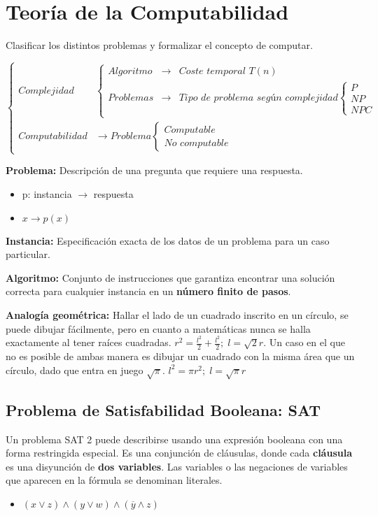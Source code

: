 \chapter{Teoría de la Computabilidad}\label{ch:teoria-de-la-computabilidad}
Clasificar los distintos problemas y formalizar el concepto de computar.

$\left\{\begin{matrix}
    Complejidad& \left\{\begin{matrix}
    Algoritmo &\rightarrow& \textit{Coste temporal } T(n)\\ 
    Problemas &\rightarrow& \textit{Tipo de problema según complejidad} \left\{\begin{matrix}
    P\\ 
    NP\\ 
    NPC
    \end{matrix}\right.
    \end{matrix}\right.\\ 
    Computabilidad& \rightarrow Problema \left\{\begin{matrix}
    Computable\\ 
    \textit{No computable}
    \end{matrix}\right.
    \end{matrix}\right.$

\textbf{Problema:} Descripción de una pregunta que requiere una respuesta.
\begin{itemize}
    \item p: instancia $\rightarrow$ respuesta
    \item $x \rightarrow p(x)$
\end{itemize}

\textbf{Instancia:} Especificación exacta de los datos de un problema para un caso particular.

\textbf{Algoritmo:} Conjunto de instrucciones que garantiza encontrar una solución correcta para cualquier instancia en un \textbf{número finito de pasos}.

\textbf{Analogía geométrica:} Hallar el lado de un cuadrado inscrito en un círculo, se puede dibujar fácilmente, pero en cuanto a matemáticas nunca se halla exactamente al tener raíces cuadradas. $r^2 = \frac{l^2}{2}+\frac{l^2}{2}; \; l= \sqrt{2}r$. Un caso en el que no es posible de ambas manera es dibujar un cuadrado con la misma área que un círculo, dado que entra en juego $\sqrt{\pi}$. $l^2 = \pi r^2; \; l = \sqrt{\pi}r$

\section{Problema de Satisfabilidad Booleana: SAT}
Un problema SAT 2 puede describirse usando una expresión booleana con una forma restringida especial. Es una conjunción de cláusulas, donde cada \textbf{cláusula} es una disyunción de \textbf{dos variables}. Las variables o las negaciones de variables que aparecen en la fórmula se denominan literales.
\begin{itemize}
    \item $(x \vee z) \wedge (y \vee w) \wedge (\overline{y} \wedge z)$
\end{itemize}

